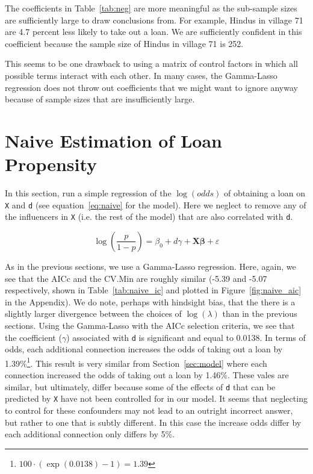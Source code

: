 \documentclass[11pt, fleqn]{article}
\begin{document}
The coefficients in Table~\ref{tab:neg} are more meaningful as the sub-sample sizes are sufficiently large to draw conclusions from. For example, Hindus in village 71 are 4.7 percent less likely to take out a loan. We are sufficiently confident in this coefficient because the sample size of Hindus in village 71 is 252. 

This seems to be one drawback to using a matrix of control factors in which all possible terms interact with each other. In many cases, the Gamma-Lasso regression does not throw out coefficients that we might want to ignore anyway because of sample sizes that are insufficiently large. 





\section{Naive Estimation of Loan Propensity}

In this section, run a simple regression of the $\log(odds)$ of obtaining a loan on \texttt{X} and \texttt{d} (see equation~\ref{eq:naive} for the model).  Here we neglect to remove any of the influencers in \texttt{X} (i.e. the rest of the model) that are also correlated with \texttt{d}.

\begin{equation} \label{eq:naive}
\log\left(\frac{p}{1-p}\right) = \beta_0 + d \gamma + \bm{X}\bm{\beta} + \varepsilon
\end{equation}

As in the previous sections, we use a Gamma-Lasso regression.  Here, again, we see that the AICc and the CV.Min are roughly similar (-5.39 and -5.07 respectively, shown in Table~\ref{tab:naive_ic} and plotted in Figure~\ref{fig:naive_aic} in the Appendix).  We do note, perhaps with hindsight bias, that the there is a slightly larger divergence between the choices of $\log(\lambda)$ than in the previous sections.  Using the Gamma-Lasso with the AICc selection criteria, we see that the coefficient ($\gamma$) associated with \texttt{d} is significant and equal to 0.0138.  In terms of odds, each additional connection increases the odds of taking out a loan by 1.39\%\footnote{$100 \cdot \left( \exp(0.0138) - 1\right) = 1.39$}.  This result is very similar from Section~\ref{sec:model} where each connection increased the odds of taking out a loan by 1.46\%.  These vales are similar, but ultimately, differ because some of the effects of \texttt{d} that can be predicted by \texttt{X} have not been controlled for in our model.  It seems that neglecting to control for these confounders may not lead to an outright incorrect answer, but rather to one that is subtly different.  In this case the increase odds differ by each additional connection only differs by 5\%.
\end{document}

